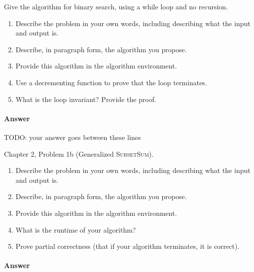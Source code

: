 \documentclass{article}
\begin{document}

\nextprob
{}

Give the algorithm for binary search, using a while loop and no recursion.

\begin{enumerate}
    \item Describe the problem in your own words, including
        describing what the input and output is.
    \item Describe, in paragraph form, the algorithm you propose.
    \item Provide this algorithm in the algorithm environment.
    \item Use a decrementing function to prove that the loop terminates.
    \item What is the loop invariant? Provide the proof.
\end{enumerate}

\paragraph{Answer}


TODO: your answer goes between these lines


\nextprob
{}

Chapter 2, Problem 1b (Generalized \textsc{SubsetSum}).
\begin{enumerate}
    \item Describe the problem in your own words, including
        describing what the input and output is.
    \item Describe, in paragraph form, the algorithm you propose.
    \item Provide this algorithm in the algorithm environment.
    \item What is the runtime of your algorithm?
    \item Prove partial correctness (that if your algorithm terminates, it is
        correct).
\end{enumerate}



\paragraph{Answer}

\end{document}
